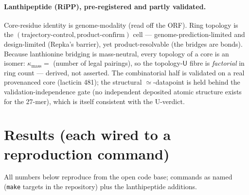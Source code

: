 \documentclass[11pt]{article}
\newcommand{\U}{\mathsf{U}}
\begin{document}
\paragraph{Lanthipeptide (RiPP), pre-registered and partly validated.} Core-residue identity is
genome-modality (read off the ORF). Ring topology is the
$(\text{trajectory-control},\text{product-confirm})$ cell --- genome-prediction-limited and
design-limited (Repka's barrier), yet product-resolvable (the bridges are bonds). Because lanthionine
bridging is mass-neutral, every topology of a core is an isomer: $\kappa_{\mathrm{mass}}=$ (number of
legal pairings), so the topology-$\U$ fibre is \emph{factorial} in ring count --- derived, not asserted.
The combinatorial half is validated on a real provenanced core (lacticin 481); the structural
$\simeq$-datapoint is held behind the validation-independence gate (no independent deposited atomic
structure exists for the 27-mer), which is itself consistent with the U-verdict.

\section{Results (each wired to a reproduction command)}
All numbers below reproduce from the open code base; commands as named (\texttt{make} targets in the
repository) plus the lanthipeptide additions.
\end{document}
